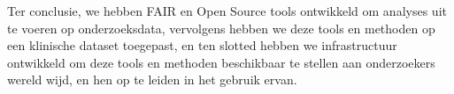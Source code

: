 Ter conclusie, we hebben FAIR en Open Source tools ontwikkeld om analyses uit te voeren op onderzoeksdata, vervolgens hebben we deze tools en methoden op een klinische dataset toegepast, en ten slotted hebben we infrastructuur ontwikkeld om deze tools en methoden beschikbaar te stellen aan onderzoekers wereld wijd, en hen op te leiden in het gebruik ervan.
